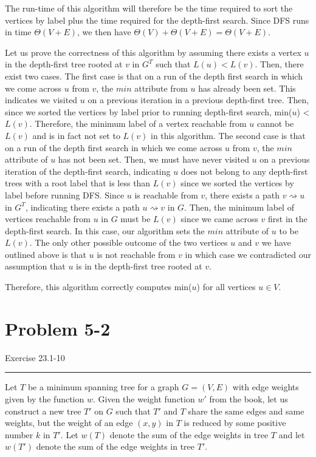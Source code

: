 \documentclass[11pt]{article}
\def\separateline{\medskip\hrule\medskip}
\begin{document}
The run-time of this algorithm will therefore be the time required to sort the vertices by label plus the time required for the depth-first search. Since DFS runs in time $\Theta(V+E)$, we then have $\Theta(V) + \Theta(V+E) = \Theta(V+E)$.

Let us prove the correctness of this algorithm by assuming there exists a vertex $u$ in the depth-first tree rooted at $v$ in $G^T$ such that $L(u) < L(v)$. Then, there exist two cases. The first case is that on a run of the depth first search in which we come across $u$ from $v$, the $min$ attribute from $u$ has already been set. This indicates we visited $u$ on a previous iteration in a previous depth-first tree. Then, since we sorted the vertices by label prior to running depth-first search, min($u$) < $L(v)$. Therefore, the minimum label of a vertex reachable from $u$ cannot be $L(v)$ and is in fact not set to $L(v)$ in this algorithm. The second case is that on a run of the depth first search in which we come across $u$ from $v$, the $min$ attribute of $u$ has not been set. Then, we must have never visited $u$ on a previous iteration of the depth-first search, indicating $u$ does not belong to any depth-first trees with a root label that is less than $L(v)$ since we sorted the vertices by label before running DFS. Since $u$ is reachable from $v$, there exists a path $v \rightsquigarrow u$ in $G^T$, indicating there exists a path $u \rightsquigarrow v$ in $G$. Then, the minimum label of vertices reachable from $u$ in $G$ must be $L(v)$ since we came across $v$ first in the depth-first search. In this case, our algorithm sets the $min$ attribute of $u$ to be $L(v)$. The only other possible outcome of the two vertices $u$ and $v$ we have outlined above is that $u$ is not reachable from $v$ in which case we contradicted our assumption that $u$ is in the depth-first tree rooted at $v$.

Therefore, this algorithm correctly computes min($u$) for all vertices $u \in V$.

\newpage

\section{Problem 5-2}
Exercise 23.1-10
\separateline

Let $T$ be a minimum spanning tree for a graph $G = (V,E)$ with edge weights given by the function $w$. Given the weight function $w'$ from the book, let us construct a new tree $T'$ on $G$ such that $T'$ and $T$ share the same edges and same weights, but the weight of an edge $(x,y)$ in $T$ is reduced by some positive number $k$ in $T'$. Let $w(T)$ denote the sum of the edge weights in tree $T$ and let $w(T')$ denote the sum of the edge weights in tree $T'$.
\end{document}
